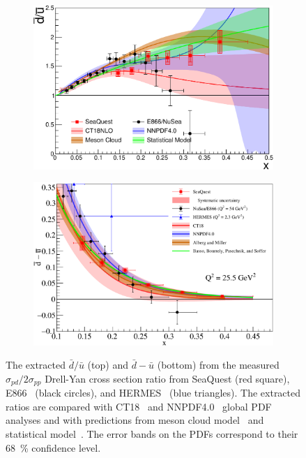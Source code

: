 \documentclass[reprint,aps,unsortedaddress,superscriptaddress,prl,floatfix,showpacs,linenumbers,final]{revtex4-2}
\begin{document}
\begin{figure}[htpb!]
	\centering
	\begin{subfigure}{0.45\linewidth}
		\includegraphics[width=\linewidth]{E906_E866_dbarubar_PDF_model.pdf}
	\end{subfigure}
	\begin{subfigure}{0.45\linewidth}
		\includegraphics[width=\linewidth]{dbub_diff.pdf}
	\end{subfigure}
	\caption{The extracted $\bar{d}/\bar{u}$ (top) and $\bar{d}-\bar{u}$ (bottom)
		from the measured $\sigma_{pd}/2\sigma_{pp}$ Drell-Yan cross section ratio
		from SeaQuest (red square), E866~\cite{towell2001} (black circles), and HERMES~\cite{ackerstaff1998} (blue triangles).
		The extracted ratios are compared with CT18~\cite{hou2021} and NNPDF4.0~\cite{ball2022a} global PDF analyses
		and with predictions from meson cloud model~\cite{alberg2022} and statistical model~\cite{soffer2019}.
		The error bands on the PDFs correspond to their \SI{68}{\percent} confidence level.
	}
	\label{fig:e906_e866_dbarubar}
\end{figure}
\end{document}
